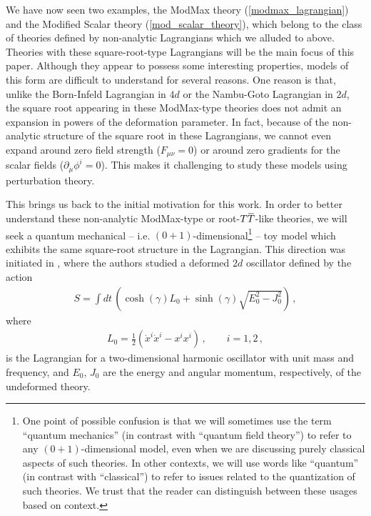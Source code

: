 \documentclass[12pt]{article}
\numberwithin{equation}{section}
\newcommand{\overbar}[1]{\mkern 1.5mu\overline{\mkern-1.5mu#1\mkern-1.5mu}\mkern 1.5mu}
\def\TT{{T\overbar{T}}}
\begin{document}
We have now seen two examples, the ModMax theory (\ref{modmax_lagrangian}) and the Modified Scalar theory (\ref{mod_scalar_theory}), which belong to the class of theories defined by non-analytic Lagrangians which we alluded to above. Theories with these square-root-type Lagrangians will be the main focus of this paper. Although they appear to possess some interesting properties, models of this form are difficult to understand for several reasons. One reason is that, unlike the Born-Infeld Lagrangian in $4d$ or the Nambu-Goto Lagrangian in $2d$, the square root appearing in these ModMax-type theories does not admit an expansion in powers of the deformation parameter. In fact, because of the non-analytic structure of the square root in these Lagrangians, we cannot even expand around zero field strength ($F_{\mu \nu} = 0$) or around zero gradients for the scalar fields ($\partial_\mu \phi^i = 0$). This makes it challenging to study these models using perturbation theory.

This brings us back to the initial motivation for this work. In order to better understand these non-analytic ModMax-type or root-$\TT$-like theories, we will seek a quantum mechanical -- i.e. $(0+1)$-dimensional\footnote{One point of possible confusion is that we will sometimes use the term ``quantum mechanics'' (in contrast with ``quantum field theory'') to refer to any $(0+1)$-dimensional model, even when we are discussing purely classical aspects of such theories. In other contexts, we will use words like ``quantum'' (in contrast with ``classical'') to refer to issues related to the quantization of such theories. We trust that the reader can distinguish between these usages based on context.} -- toy model which exhibits the same square-root structure in the Lagrangian. This direction was initiated in \cite{Garcia:2022wad}, where the authors studied a deformed $2d$ oscillator defined by the action
%
\begin{align}\label{garcia_deformed_oscillator}
    S = \int dt \, \left( \cosh ( \gamma ) L_0 + \sinh ( \gamma ) \sqrt{ E_0^2 - J_0^2 } \right) \, , 
\end{align}
%
where
%
\begin{align}
    L_0 = \frac{1}{2} \left( \dot{x}^i \dot{x}^i - x^i x^i \right)  \, , \qquad i = 1 , 2 \, , 
\end{align}
%
is the Lagrangian for a two-dimensional harmonic oscillator with unit mass and frequency, and $E_0$, $J_0$ are the energy and angular momentum, respectively, of the undeformed theory.
\end{document}
